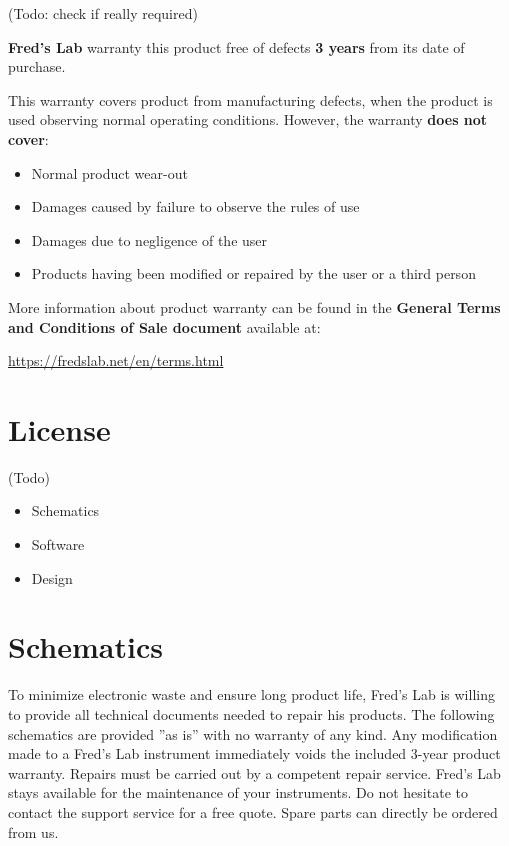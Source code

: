\documentclass{scrartcl}
\begin{document}
 (Todo: check if really required)

\textbf{Fred's Lab} warranty this product free of defects \textbf{3 years} from its
date of purchase.

This warranty covers product from manufacturing defects, when the product is used observing normal operating conditions. However, the warranty \textbf{does not cover}:

\begin{itemize}
    \item Normal product wear-out
    \item Damages caused by failure to observe the rules of use
    \item Damages due to negligence of the user
    \item Products having been modified or repaired by the user or a third person
\end{itemize}

More information about product warranty can be found in the \textbf{General Terms and Conditions of Sale document} available at:
\begin{center}
    \url{https://fredslab.net/en/terms.html}
\end{center}


\section{License}

 (Todo)

\begin{itemize}
    \item Schematics
    \item Software
    \item Design
\end{itemize}

\pagebreak


\section{Schematics}

To minimize electronic waste and ensure long product life, Fred’s Lab is willing to provide all technical documents needed to repair his products. The following schematics are provided ”as is” with no warranty of any kind. Any modification made to a Fred’s Lab instrument immediately voids the included 3-year product warranty. Repairs must be carried out by a competent repair service. Fred’s Lab stays available for the maintenance of your instruments. Do not hesitate to contact the support service for a free quote. Spare parts can directly be ordered from us.
\end{document}
